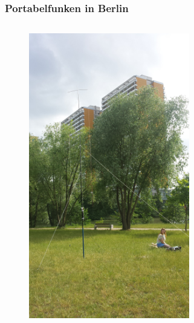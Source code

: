 \begin{frame}
  \frametitle{Portabelfunken in Berlin}
  \begin{columns}[c]
    \column[c]{5cm}
    \begin{center}
      \begin{figure}
        \includegraphics[width=0.82\textwidth,height=.75\textheight,keepaspectratio]{a09/db4um_dm1ri_portabel.jpg}
      \end{figure}
    \end{center}
    \column{5cm} \large
    \begin{center}
      \begin{figure}

\end{figure}
\end{center}
\end{columns}
\end{frame}
